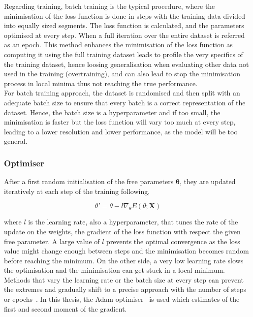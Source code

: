 Regarding training, batch training is the typical procedure, where the minimisation of the loss function is done in steps with the training data divided into equally sized segments. The loss function is calculated, and the parameters optimised at every step. When a full iteration over the entire dataset is referred as an epoch. This method enhances the minimisation of the loss function as computing it using the full training dataset leads to profile the very specifics of the training dataset, hence loosing generalisation when evaluating other data not used in the training (overtraining), and can also lead to stop the minimisation process in local minima thus not reaching the true performance.\\

For batch training approach, the dataset is randomised and then split with an adequate batch size to ensure that every batch is a correct representation of the dataset. Hence, the batch size is a hyperparameter and if too small, the minimisation is faster but the loss function will vary too much at every step, leading to a lower resolution and lower performance, as the model will be too general. 

\subsubsection{Optimiser}

After a first random initialisation of the free parameters $\boldsymbol{\theta}$, they are updated iteratively at each step of the training following,

\begin{equation}
    \theta' = \theta - l \nabla_\theta E(\theta;\mathbf{X})
\end{equation}

where $l$ is the learning rate, also a hyperparameter, that tunes the rate of the update on the weights, the gradient of the loss function with respect the given free parameter. A large value of $l$ prevents the optimal convergence as the loss value might change enough between steps and the minimisation becomes random before reaching the minimum. On the other side, a very low learning rate slows the optimisation and the minimisation can get stuck in a local minimum. Methods that vary the learning rate or the batch size at every step can prevent the extremes and gradually shift to a precise approach with the number of steps or epochs~\cite{LRBatchSize}. In this thesis, the Adam optimiser~\cite{Kingma2015AdamAM} is used which estimates of the first and second moment of the gradient.

